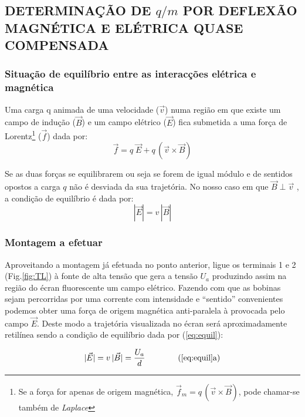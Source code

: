 \documentclass[a4paper,twoside,12pt]{article}      %
\begin{document}
\subsection{\sf DETERMINAÇÃO DE $q/m$ POR DEFLEXÃO\\ MAGNÉTICA E ELÉTRICA QUASE COMPENSADA }

\subsubsection{\sf Situação de equilíbrio entre as interacções elétrica e magnética}
Uma carga q animada de uma velocidade ($\vec{v}$) numa região em que existe um campo de indução ($\vec{B}$) e um campo elétrico ($\vec{E}$) fica submetida a uma força de Lorentz\footnote{Se a força for apenas de origem magnética, $\vec{f}_m =  q\,(\vec{v} \times \vec{B})$, pode chamar-se também de \emph{Laplace}} ($\vec{f}$) dada por:
\begin{equation}
	\label{eq:Lorentz}
 \vec{f} = q\; \vec{E} + q\,(\vec{v} \times \vec{B})
\end{equation}

Se as duas forças se equilibrarem ou seja se forem de igual módulo e de sentidos opostos a carga $q$ não é desviada da sua trajetória. No nosso caso em que $\vec{B} \perp \vec{v}$ , a condição de equilíbrio é dada por:
\begin{equation}
	\label{eq:equil}
 |\vec{E}| = v\, |\vec{B}|
\end{equation}

\subsubsection{\sf Montagem a efetuar}

Aproveitando a montagem já efetuada no ponto anterior, ligue os terminais 1 e 2 (Fig.\ref{fig:TL}) à fonte de alta tensão que gera a tensão $U_a$ produzindo assim na região do écran fluorescente um campo elétrico. Fazendo com que as bobinas sejam percorridas por uma corrente com intensidade e  ``sentido'' convenientes podemos obter uma força de origem magnética anti-paralela à provocada pelo campo $\vec{E}$. 
Deste modo a trajetória visualizada no écran será aproximadamente retilínea sendo a condição de equilíbrio dada por (\ref{eq:equil}):

\begin{equation*}
 |\vec{E}| = v\, |\vec{B}| = \frac{U_a}{d} \qquad  \qquad  \textrm{(\ref{eq:equil}a)}
\end{equation*}
\end{document}
